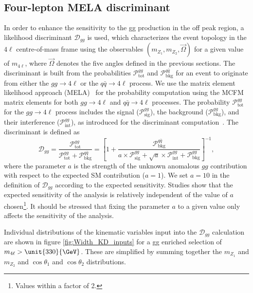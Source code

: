 \subsection{Four-lepton MELA discriminant}
\label{sec:MELA_gg}

In order to enhance the sensitivity to the gg production in the off peak region, a likelihood discriminant
$\mathcal{D}_{gg}$ is used, which characterizes the event topology in the $4\ell$ centre-of-mass frame
using the observables $(m_{Z_1}, m_{Z_2}, \vec\Omega)$ for a given value of $m_{4\ell}$, where
$\vec\Omega$ denotes the five angles defined in the previous sections. The discriminant is built from the
probabilities $\mathcal{P}^{gg}_\text{tot}$ and $\mathcal{P}^{q\bar{q}}_\text{bkg}$
for an event to originate from either the $gg \to 4\ell$ or the $q\bar{q} \to 4\ell$
process. We use the matrix element likelihood approach (MELA)~\cite{Chatrchyan:2012ufa, Bolognesi:2012mm}
for the probability computation using the \textsc{MCFM} matrix elements for both $gg \to 4\ell$ and
$q\bar{q} \to 4\ell$ processes.
The probability $\mathcal{P}^{gg}_\text{tot}$ for the $gg \to 4\ell$ process includes
the signal ($\mathcal{P}^{gg}_\text{sig}$), the background ($\mathcal{P}^{gg}_\text{bkg}$),
and their interference ($\mathcal{P}^{gg}_\text{int}$), as introduced for the discriminant computation~\cite{Anderson:2013afp}. The discriminant is defined as
\begin{equation}
\label{eq:kd-ggmela}
\mathcal{D}_{gg} = \frac{\mathcal{P}^{gg}_\text{tot}  }{\mathcal{P}^{gg}_\text{tot}  + \mathcal{P}^{q\bar{q}}_\text{bkg} }=
\left[1+\frac{\mathcal{P}^{q\bar{q}}_\text{bkg}  }
{a \times \mathcal{P}^{gg}_\text{sig} +  \sqrt{a} \times  \mathcal{P}^{gg}_\text{int} + \mathcal{P}^{gg}_\text{bkg}  } \right]^{-1} ,
\end{equation}
where
the parameter $a$ is the strength of the unknown anomalous $gg$ contribution with respect to the
expected SM contribution ($a=1$). We set $a = 10$ in the definition of $\mathcal{D}_{gg}$ according
to the expected sensitivity. Studies show that the expected sensitivity of the analysis is relatively independent of the value of $a$ chosen\footnote{Values within a factor of 2.}. It should be stressed that fixing the parameter $a$ to
a given value only affects the sensitivity of the analysis. 

Individual distributions of the kinematic variables input into the $\mathcal{D}_{gg}$ calculation are shown in figure \ref{fig:Width_KD_inputs} for a gg enriched selection of $m_{4\ell} > \unit{330}{\GeV}$. These are simplified by summing together the $m_{Z_{1}}$ and $m_{Z_{2}}$ and $\cos\theta_{1}$ and $\cos\theta_{2}$ distributions.

